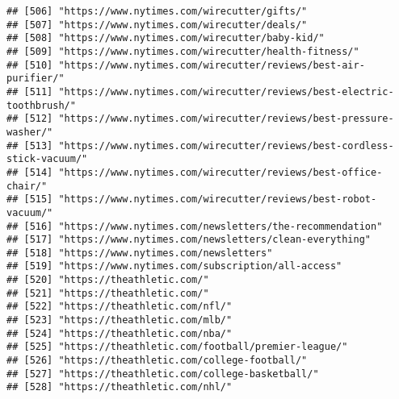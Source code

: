 \documentclass[
]{article}
\begin{document}
\begin{verbatim}
## [506] "https://www.nytimes.com/wirecutter/gifts/"                                                                 
## [507] "https://www.nytimes.com/wirecutter/deals/"                                                                 
## [508] "https://www.nytimes.com/wirecutter/baby-kid/"                                                              
## [509] "https://www.nytimes.com/wirecutter/health-fitness/"                                                        
## [510] "https://www.nytimes.com/wirecutter/reviews/best-air-purifier/"                                             
## [511] "https://www.nytimes.com/wirecutter/reviews/best-electric-toothbrush/"                                      
## [512] "https://www.nytimes.com/wirecutter/reviews/best-pressure-washer/"                                          
## [513] "https://www.nytimes.com/wirecutter/reviews/best-cordless-stick-vacuum/"                                    
## [514] "https://www.nytimes.com/wirecutter/reviews/best-office-chair/"                                             
## [515] "https://www.nytimes.com/wirecutter/reviews/best-robot-vacuum/"                                             
## [516] "https://www.nytimes.com/newsletters/the-recommendation"                                                    
## [517] "https://www.nytimes.com/newsletters/clean-everything"                                                      
## [518] "https://www.nytimes.com/newsletters"                                                                       
## [519] "https://www.nytimes.com/subscription/all-access"                                                           
## [520] "https://theathletic.com/"                                                                                  
## [521] "https://theathletic.com/"                                                                                  
## [522] "https://theathletic.com/nfl/"                                                                              
## [523] "https://theathletic.com/mlb/"                                                                              
## [524] "https://theathletic.com/nba/"                                                                              
## [525] "https://theathletic.com/football/premier-league/"                                                          
## [526] "https://theathletic.com/college-football/"                                                                 
## [527] "https://theathletic.com/college-basketball/"                                                               
## [528] "https://theathletic.com/nhl/"                                                                              

\end{verbatim}
\end{document}
